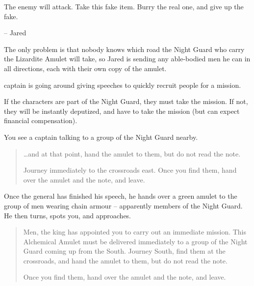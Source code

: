 \begin{multicols}{2}
\begin{boxtext}

	The enemy will attack. Take this fake item.  Burry the real one, and give up the fake.

	-- Jared

\end{boxtext}

The only problem is that nobody knows which road the Night Guard who carry the Lizardite Amulet will take, so Jared is sending any able-bodied men he can in all directions, each with their own copy of the amulet.

\Gls{captain} is going around giving speeches to quickly recruit people for a mission.

If the characters are part of the Night Guard, they must take the mission.
If not, they will be instantly deputized, and have to take the mission (but can expect financial compensation).

\begin{boxtext}

	You see a \gls{captain} talking to a group of the Night Guard nearby.

	\begin{quotation}

		\ldots and at that point, hand the amulet to them, but do not read the note.

		Journey immediately to the crossroads east.
		Once you find them, hand over the amulet and the note, and leave.

	\end{quotation}

	Once the general has finished his speech, he hands over a green amulet to the group of men wearing chain armour -- apparently members of the Night Guard.
	He then turns, spots you, and approaches.

	\begin{quotation}

		Men, the king has appointed you to carry out an immediate mission.
		This Alchemical Amulet must be delivered immediately to a group of the Night Guard coming up from the South.
		Journey South, find them at the crossroads, and hand the amulet to them, but do not read the note.

		Once you find them, hand over the amulet and the note, and leave.

	\end{quotation}

\end{boxtext}


\end{multicols}
